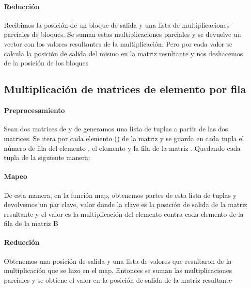    \paragraph{Reducción}

        Recibimos la posición de un bloque de salida y una lista de
        multiplicaciones parciales de bloques. Se suman estas multiplicaciones
        parciales y se devuelve un vector con los valores resultantes de la
        multiplicación. Pero por cada valor se calcula la posición de salida del
        mismo en la matriz resultante y nos deshacemos de la posición de los
        bloques

\subsection{Multiplicación de matrices de elemento por fila}

    \paragraph{Preprocesamiento}

        Sean dos matrices  de  y  de 
        generamos una lista de tuplas a partir de las dos matrices.
        Se itera por cada elemento () de la matriz  y se
        guarda en cada tupla el número de fila  del elemento
        , el elemento  y la fila  de la
        matriz . Quedando cada tupla de la siguiente manera:\\

    \paragraph{Mapeo}

        De esta manera, en la función map, obtenemos partes de esta lista de
        tuplas y devolvemos un par clave, valor donde la clave es la posición
        de salida de la matriz resultante  y el valor es la
        multiplicación del elemento  contra cada elemento de la
        fila  de la matriz B

    \paragraph{Reducción}

        Obtenemos una posición de salida y una lista de valores que resultaron
        de la multiplicación que se hizo en el map. Entonces se suman las
        multiplicaciones parciales y se obtiene el valor en la posición de salida
        de la matriz resultante

